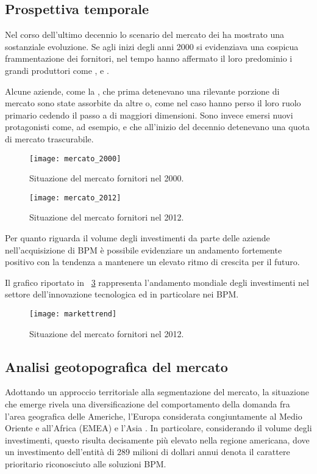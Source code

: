 \subsection{Prospettiva temporale}
Nel corso dell'ultimo decennio lo scenario del mercato dei \sw ha mostrato una sostanziale evoluzione. Se agli inizi degli anni 2000 si evidenziava una cospicua frammentazione dei fornitori, nel tempo hanno affermato il loro predominio i grandi produttori come , e .

Alcune aziende, come la , che prima detenevano una rilevante porzione di mercato sono state assorbite da altre o, come nel caso  hanno perso il loro ruolo primario cedendo il passo a  di maggiori dimensioni. Sono invece emersi nuovi protagonisti come, ad esempio,  e  che all'inizio del decennio detenevano una quota di mercato trascurabile.

\begin{figure}[H]
  \centering
  \texttt{[image: mercato\_2000]}
  \caption{Situazione del mercato fornitori nel 2000.}
  \label{fig:mercato2000}
\end{figure}

\begin{figure}[H]
  \centering
  \texttt{[image: mercato\_2012]}
  \caption{Situazione del mercato fornitori nel 2012.}
  \label{fig:mercato2012}
\end{figure}

Per quanto riguarda il volume degli investimenti da parte delle aziende nell'acquisizione di \sw BPM è possibile evidenziare un andamento fortemente positivo con la tendenza a mantenere un elevato ritmo di crescita per il futuro.

Il grafico riportato in \figurename~\ref{fig:trend} rappresenta l'andamento mondiale degli investimenti nel settore dell'innovazione tecnologica ed in particolare nei \sw BPM.

\begin{figure}[H]
  \centering
  \texttt{[image: markettrend]}
  \caption{Situazione del mercato fornitori nel 2012.}
  \label{fig:trend}
\end{figure}

\subsection{Analisi geotopografica del mercato}%
Adottando un approccio territoriale alla segmentazione del mercato, la situazione che emerge rivela una diversificazione del comportamento della domanda fra l'area geografica delle Americhe, l'Europa considerata congiuntamente al Medio Oriente e all'Africa (EMEA) e l'Asia \cite{bea:bpm}. In particolare, considerando il volume degli investimenti, questo risulta decisamente più elevato nella regione americana, dove un investimento dell'entità di 289 milioni di dollari annui denota il carattere prioritario riconosciuto alle soluzioni BPM\@.

